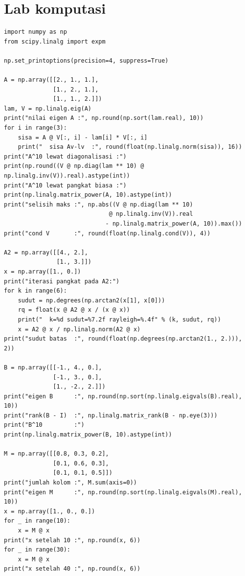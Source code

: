 
\section{Lab komputasi}

\begin{lab}
\begin{verbatim}
import numpy as np
from scipy.linalg import expm

np.set_printoptions(precision=4, suppress=True)

A = np.array([[2., 1., 1.],
              [1., 2., 1.],
              [1., 1., 2.]])
lam, V = np.linalg.eig(A)
print("nilai eigen A :", np.round(np.sort(lam.real), 10))
for i in range(3):
    sisa = A @ V[:, i] - lam[i] * V[:, i]
    print("  sisa Av-lv  :", round(float(np.linalg.norm(sisa)), 16))
print("A^10 lewat diagonalisasi :")
print(np.round((V @ np.diag(lam ** 10) @ np.linalg.inv(V)).real).astype(int))
print("A^10 lewat pangkat biasa :")
print(np.linalg.matrix_power(A, 10).astype(int))
print("selisih maks :", np.abs((V @ np.diag(lam ** 10)
                              @ np.linalg.inv(V)).real
                             - np.linalg.matrix_power(A, 10)).max())
print("cond V       :", round(float(np.linalg.cond(V)), 4))

A2 = np.array([[4., 2.],
               [1., 3.]])
x = np.array([1., 0.])
print("iterasi pangkat pada A2:")
for k in range(6):
    sudut = np.degrees(np.arctan2(x[1], x[0]))
    rq = float(x @ A2 @ x / (x @ x))
    print("  k=%d sudut=%7.2f rayleigh=%.4f" % (k, sudut, rq))
    x = A2 @ x / np.linalg.norm(A2 @ x)
print("sudut batas  :", round(float(np.degrees(np.arctan2(1., 2.))), 2))

B = np.array([[-1., 4., 0.],
              [-1., 3., 0.],
              [1., -2., 2.]])
print("eigen B      :", np.round(np.sort(np.linalg.eigvals(B).real), 10))
print("rank(B - I)  :", np.linalg.matrix_rank(B - np.eye(3)))
print("B^10         :")
print(np.linalg.matrix_power(B, 10).astype(int))

M = np.array([[0.8, 0.3, 0.2],
              [0.1, 0.6, 0.3],
              [0.1, 0.1, 0.5]])
print("jumlah kolom :", M.sum(axis=0))
print("eigen M      :", np.round(np.sort(np.linalg.eigvals(M).real), 10))
x = np.array([1., 0., 0.])
for _ in range(10):
    x = M @ x
print("x setelah 10 :", np.round(x, 6))
for _ in range(30):
    x = M @ x
print("x setelah 40 :", np.round(x, 6))


\end{verbatim}
\end{lab}
